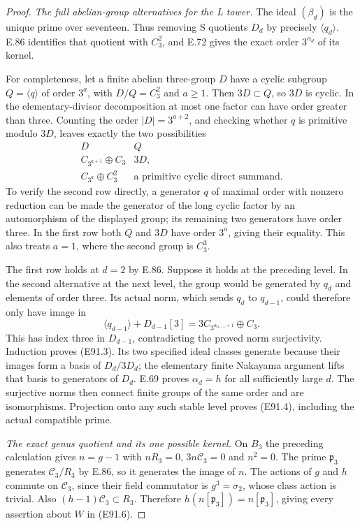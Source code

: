 \begin{proof}
\emph{The full abelian-group alternatives for the L tower.}
The ideal $(\beta_d)$ is the unique prime over seventeen.
Thus removing S quotients $D_d$ by precisely $\langle q_d\rangle$.
E.86 identifies that quotient with $C_3^2$, and E.72 gives the
exact order $3^{\alpha_d}$ of its kernel.

For completeness, let a finite abelian three-group $D$ have a
cyclic subgroup $Q=\langle q\rangle$ of order $3^a$, with
$D/Q=C_3^2$ and $a\ge1$. Then $3D\subset Q$, so $3D$ is
cyclic. In the elementary-divisor decomposition at most one
factor can have order greater than three. Counting the order
$|D|=3^{a+2}$, and checking whether $q$ is primitive modulo
$3D$, leaves exactly the two possibilities
\[
 \begin{array}{c|c}
 D&Q\\ \hline
 C_{3^{a+1}}\oplus C_3&3D,\\
 C_{3^a}\oplus C_3^2&\text{a primitive cyclic direct summand}.
 \end{array}
 \tag{E91.14}
\]
To verify the second row directly, a generator $q$ of maximal
order with nonzero reduction can be made the generator of the
long cyclic factor by an automorphism of the displayed group;
its remaining two generators have order three. In the first
row both $Q$ and $3D$ have order $3^a$, giving their equality.
This also treats $a=1$, where the second group is $C_3^3$.

The first row holds at $d=2$ by E.86. Suppose it holds at the
preceding level. In the second alternative at the next level,
the group would be generated by $q_d$ and elements of order
three. Its actual norm, which sends $q_d$ to $q_{d-1}$, could
therefore only have image in
\[
 \langle q_{d-1}\rangle+D_{d-1}[3]
             =3C_{3^{\alpha_{d-1}+1}}\oplus C_3.
 \tag{E91.15}
\]
This has index three in $D_{d-1}$, contradicting the proved
norm surjectivity. Induction proves (E91.3). Its two specified
ideal classes generate because their images form a basis of
$D_d/3D_d$; the elementary finite Nakayama argument lifts that
basis to generators of $D_d$.
E.69 proves $\alpha_d=h$ for all sufficiently large $d$.
The surjective norms then connect finite groups of the same
order and are isomorphisms. Projection onto any such stable
level proves (E91.4), including the actual compatible prime.

\emph{The exact genus quotient and its one possible kernel.}
On $B_3$ the preceding calculation gives $n=g-1$ with
$nR_3=0$, $3n\mathcal C_3=0$ and $n^2=0$. The prime
$\mathfrak p_3$ generates $\mathcal C_3/R_3$ by E.86, so it generates
the image of $n$. The actions of $g$ and $h$ commute on
$\mathcal C_3$, since their field commutator is $g^3=\sigma_2$, whose
class action is trivial. Also $(h-1)\mathcal C_3\subset R_3$. Therefore
$h(n[\mathfrak p_3])=n[\mathfrak p_3]$, giving every assertion
about $W$ in (E91.6).


\end{proof}
